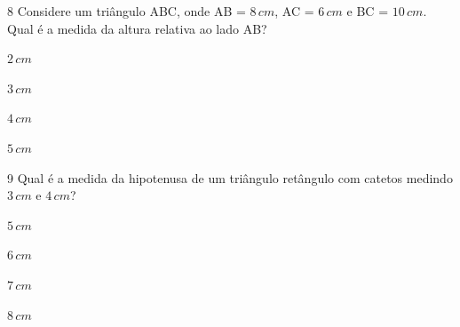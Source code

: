 \num{8}  Considere um triângulo ABC, onde AB = $8\,cm$, AC = $6\,cm$ e BC = $10\,cm$.
Qual é a medida da altura relativa ao lado AB?

\begin{escolha}
\item $2\,cm$
\item $3\,cm$
\item $4\,cm$
\item $5\,cm$
\end{escolha}



\num{9}  Qual é a medida da hipotenusa de um triângulo retângulo com catetos
medindo $3\,cm$ e $4\,cm$?

\begin{escolha}
\item $5\,cm$
\item $6\,cm$
\item $7\,cm$
\item $8\,cm$
\end{escolha}



